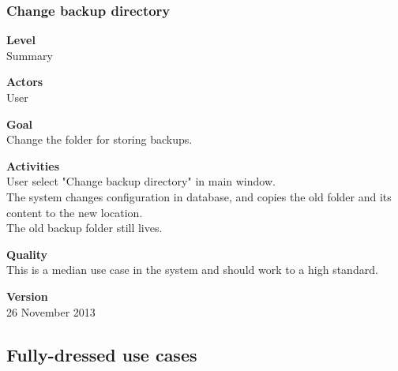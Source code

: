 \documentclass[12pt,a4paper]{article}
\begin{document}
\subsubsection{Change backup directory}
\begin{description}
	\item \textbf{Level} \\
	Summary
	\item \textbf{Actors} \\
	User
	\item \textbf{Goal} \\
	Change the folder for storing backups.
	\item \textbf{Activities} \\
	User select "Change backup directory" in main window.\\
	The system changes configuration in database, and copies the old folder and its content to the new location.\\
	The old backup folder still lives.
	\item \textbf{Quality} \\
	This is a median use case in the system and should work to a high standard.
	\item \textbf{Version} \\
	26 November 2013
\end{description}

\subsection{Fully-dressed use cases}
\end{document}
